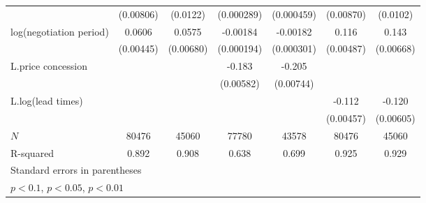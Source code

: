 {\begin{adjustbox}{max width=\textwidth}
\begin{adjustbox}{max width=\textwidth}
\begin{tabular}{l*{6}{c}}
            &   (0.00806)         &    (0.0122)         &  (0.000289)         &  (0.000459)         &   (0.00870)         &    (0.0102)         \\
\addlinespace
log(negotiation period)&      0.0606\sym{***}&      0.0575\sym{***}&    -0.00184\sym{***}&    -0.00182\sym{***}&       0.116\sym{***}&       0.143\sym{***}\\
            &   (0.00445)         &   (0.00680)         &  (0.000194)         &  (0.000301)         &   (0.00487)         &   (0.00668)         \\
\addlinespace
L.price concession&                     &                     &      -0.183\sym{***}&      -0.205\sym{***}&                     &                     \\
            &                     &                     &   (0.00582)         &   (0.00744)         &                     &                     \\
\addlinespace
L.log(lead times)   &                     &                     &                     &                     &      -0.112\sym{***}&      -0.120\sym{***}\\
            &                     &                     &                     &                     &   (0.00457)         &   (0.00605)         \\
\midrule
\(N\)       &       80476         &       45060         &       77780         &       43578         &       80476         &       45060         \\
R-squared   &       0.892         &       0.908         &       0.638         &       0.699         &       0.925         &       0.929         \\
\bottomrule
\multicolumn{7}{l}{\footnotesize Standard errors in parentheses}\\
\multicolumn{7}{l}{\footnotesize \sym{*} \(p<0.1\), \sym{**} \(p<0.05\), \sym{***} \(p<0.01\)}\\
\end{tabular}
\end{adjustbox}
\end{adjustbox}
}
